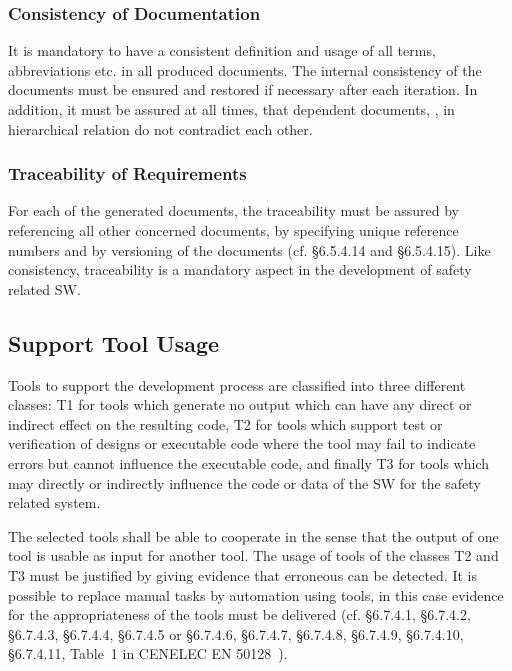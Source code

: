 \subsubsection{Consistency of Documentation}
\label{sec:cons-docum}

It is mandatory to have a consistent definition and usage of all terms,
abbreviations etc. in all produced documents. The internal consistency of the
documents must be ensured and restored if necessary after each iteration. In
addition, it must be assured at all times, that dependent documents, \ie, in
hierarchical relation do not contradict each other.

\subsubsection{Traceability of Requirements}
\label{sec:trac-requ}

For each of the generated documents, the traceability must be assured by
referencing all other concerned documents, by specifying unique reference
numbers and by versioning of the documents (cf. §6.5.4.14 and §6.5.4.15). Like
consistency, traceability is a mandatory aspect in the development of safety
related SW.

\subsection{Support Tool Usage}
\label{sec:tool-usage}

Tools to support the development process are classified into three different
classes: T1 for tools which generate no output which can have any direct or
indirect effect on the resulting code, T2 for tools which support test or
verification of designs or executable code where the tool may fail to indicate
errors but cannot influence the executable code, and finally T3 for tools which
may directly or indirectly influence the code or data of the SW for the safety
related system.

The selected tools shall be able to cooperate in the sense that the output of
one tool is usable as input for another tool. The usage of tools of the classes
T2 and T3 must be justified by giving evidence that erroneous can be
detected. It is possible to replace manual tasks by automation using tools, in
this case evidence for the appropriateness of the tools must be delivered (cf.
§6.7.4.1, §6.7.4.2, §6.7.4.3, §6.7.4.4, §6.7.4.5 or §6.7.4.6, §6.7.4.7,
§6.7.4.8, §6.7.4.9, §6.7.4.10, §6.7.4.11, Table~1 in CENELEC EN
50128~\cite{EN-50128}).


